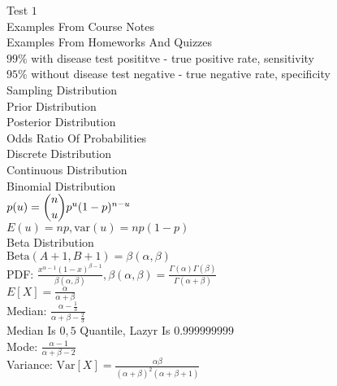 
\tiny
\twocolumn

Test $1$ \\
Examples From Course Notes \\
Examples From Homeworks And Quizzes \\
$99\%$ with disease test posititve - true positive rate, sensitivity \\
$95\%$ without disease test negative - true negative rate, specificity \\
Sampling Distribution \\
Prior Distribution \\
Posterior Distribution \\
Odds Ratio Of Probabilities \\
Discrete Distribution \\
Continuous Distribution \\
Binomial Distribution \\
$p(u)=\dbinom{n}{u}p^u(1-p)^{n-u}$ \\
$E(u)=np, \text{var}(u)=np(1-p)$ \\
Beta Distribution \\
$\text{Beta}(A+1,B+1)=\beta(\alpha,\beta)$ \\
PDF: $\frac{x^{\alpha-1}(1-x)^{\beta-1}}{\beta(\alpha,\beta)}, \beta(\alpha,\beta)=\frac{\Gamma(\alpha)\Gamma(\beta)}{\Gamma(\alpha+\beta)}$ \\
$E[X]=\frac{\alpha}{\alpha+\beta}$ \\
Median: $\frac{\alpha-\frac{1}{3}}{\alpha+\beta-\frac{2}{3}}$ \\
Median Is $0,5$ Quantile, Lazyr Is $0.999999999$ \\
Mode: $\frac{\alpha-1}{\alpha+\beta-2}$ \\
Variance: $\text{Var}[X]=\frac{\alpha \beta}{(\alpha+\beta)^2(\alpha+\beta+1)}$ \\
